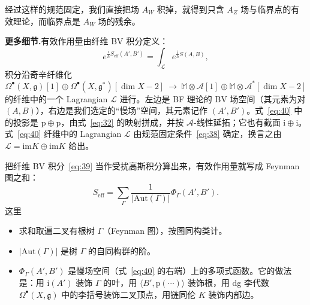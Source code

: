 
经过这样的规范固定，我们直接把场 $A_W$ 积掉，就得到只含 $A_Z$ 场与临界点的有效理论，而临界点是 $A_W$ 场的残余。

\textbf{更多细节.}\quad 有效作用量由纤维 BV 积分定义：
\begin{equation}\tag{39}\label{eq:39}
e^{\frac{i}{\hbar}S_{\mathrm{eff}}(A',B')}=\int_{\mathcal L}e^{\frac{i}{\hbar}S(A,B)},
\end{equation}
积分沿奇辛纤维化
\begin{equation}\tag{40}\label{eq:40}
\Omega^\bullet(X,\mathfrak g)[1]\oplus\Omega^\bullet(X,\mathfrak g^*)[\dim X-2]
\ \longrightarrow\
\mathbb{M}\otimes\mathcal A[1]\oplus\mathbb{M}\otimes\mathcal A^*[\dim X-2]
\end{equation}
的纤维中的一个 Lagrangian $\mathcal L$ 进行。左边是 BF 理论的 BV 场空间（其元素为对 $(A,B)$），右边是我们选定的“慢场”空间，其元素记作 $(A',B')$。式~\eqref{eq:40} 中的投影是 $\mathrm{p}\oplus\mathrm{p}$，由式~\eqref{eq:32} 的映射拼成，并按 $\mathcal A$-线性延拓；它也有截面 $\mathrm{i}\oplus\mathrm{i}$。式~\eqref{eq:40} 纤维中的 Lagrangian $\mathcal L$ 由规范固定条件~\eqref{eq:38} 确定，换言之由 $\mathcal L=\mathrm{im}K\oplus\mathrm{im}K$ 给出。


把纤维 BV 积分~\eqref{eq:39} 当作受扰高斯积分算出来，有效作用量就写成 Feynman 图之和：
\begin{equation}\tag{41}\label{eq:41}
S_{\mathrm{eff}}=\sum_{\Gamma}\frac{1}{|\mathrm{Aut}(\Gamma)|}\Phi_\Gamma(A',B').
\end{equation}
这里
\begin{itemize}
  \item 求和取遍二叉有根树 $\Gamma$（Feynman 图），按图同构类计。
  \item $|\mathrm{Aut}(\Gamma)|$ 是树 $\Gamma$ 的自同构群的阶。
  \item $\Phi_\Gamma(A',B')$ 是慢场空间（式~\eqref{eq:40} 的右端）上的多项式函数。它的做法是：用 $\mathrm{i}(A')$ 装饰 $\Gamma$ 的叶，用 $\langle B',\mathrm{p}(\cdots)\rangle$ 装饰根，用 dg 李代数 $\Omega^\bullet(X,\mathfrak g)$ 中的李括号装饰二叉顶点，用链同伦 $K$ 装饰内部边。
\end{itemize}

